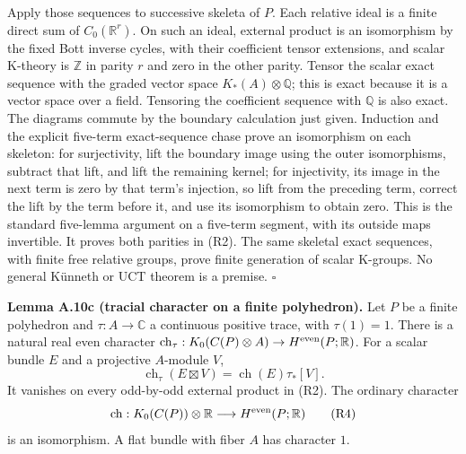 \documentclass[
  11pt,
]{article}
\begin{document}
Apply those sequences to successive skeleta of \(P\). Each relative
ideal is a finite direct sum of \(C_0(\mathbb R^r)\). On such an ideal,
external product is an isomorphism by the fixed Bott inverse cycles,
with their coefficient tensor extensions, and scalar K-theory is
\(\mathbb Z\) in parity \(r\) and zero in the other parity. Tensor the
scalar exact sequence with the graded vector space
\(K_*(A)\otimes\mathbb Q\); this is exact because it is a vector space
over a field. Tensoring the coefficient sequence with \(\mathbb Q\) is
also exact. The diagrams commute by the boundary calculation just given.
Induction and the explicit five-term exact-sequence chase prove an
isomorphism on each skeleton: for surjectivity, lift the boundary image
using the outer isomorphisms, subtract that lift, and lift the remaining
kernel; for injectivity, its image in the next term is zero by that
term's injection, so lift from the preceding term, correct the lift by
the term before it, and use its isomorphism to obtain zero. This is the
standard five-lemma argument on a five-term segment, with its outside
maps invertible. It proves both parities in (R2). The same skeletal
exact sequences, with finite free relative groups, prove finite
generation of scalar K-groups. No general Künneth or UCT theorem is a
premise. \(\square\)

\textbf{Lemma A.10c (tracial character on a finite polyhedron).} Let
\(P\) be a finite polyhedron and \(\tau:A\to\mathbb C\) a continuous
positive trace, with \(\tau(1)=1\). There is a natural real even
character
\(\operatorname{ch}_\tau:K_0(C(P)\otimes A)\to H^{\rm even}(P;\mathbb R)\).
For a scalar bundle \(E\) and a projective \(A\)-module \(V\), \[
 \operatorname{ch}_\tau(E\boxtimes V)
       =\operatorname{ch}(E)\tau_*[V].
 \tag{R3}
\] It vanishes on every odd-by-odd external product in (R2). The
ordinary character \[
 \operatorname{ch}:K_0(C(P))\otimes\mathbb R
                 \longrightarrow H^{\rm even}(P;\mathbb R)
 \tag{R4}
\] is an isomorphism. A flat bundle with fiber \(A\) has character
\(1\).
\end{document}
